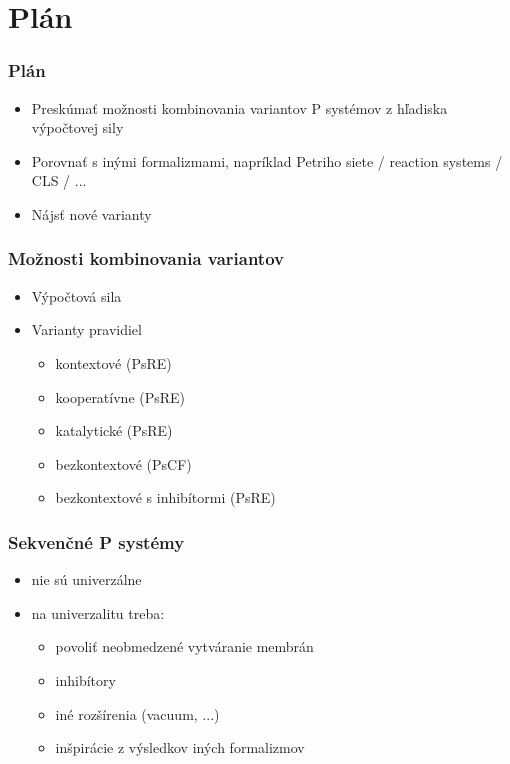 \documentclass{beamer}
\begin{document}

\section{Plán} %
\label{sec:plan}

\begin{frame}[t]\frametitle{Plán}
\begin{itemize}
  \item Preskúmať možnosti kombinovania variantov P systémov z hľadiska výpočtovej sily
  \item Porovnať s inými formalizmami, napríklad Petriho siete / reaction systems / CLS / ...
  \item Nájsť nové varianty
\end{itemize}
\end{frame}

\begin{frame}[t]\frametitle{Možnosti kombinovania variantov}
\begin{itemize}
  \item Výpočtová sila
  \item Varianty pravidiel
  \begin{itemize}
    \item kontextové (PsRE)
    \item kooperatívne (PsRE)
    \item katalytické (PsRE)
    \item bezkontextové (PsCF)

    \item bezkontextové s inhibítormi (PsRE)
  \end{itemize}
\end{itemize}
\end{frame}

\begin{frame}[t]\frametitle{Sekvenčné P systémy}
\begin{itemize}
  \item nie sú univerzálne
  \item na univerzalitu treba:
  \begin{itemize}
    \item povoliť neobmedzené vytváranie membrán
    \item inhibítory
    \item iné rozšírenia (vacuum, ...)
    \item inšpirácie z výsledkov iných formalizmov
  \end{itemize}
\end{itemize}
\end{frame}
\end{document}
